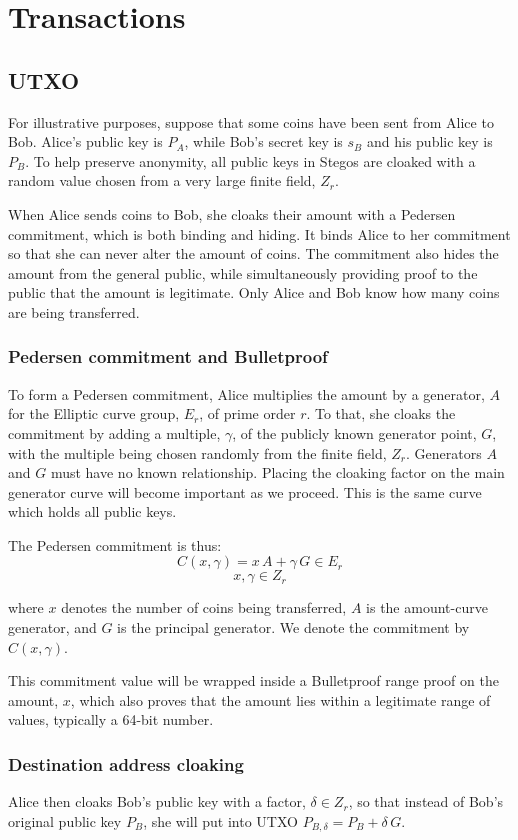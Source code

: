 \documentclass[8pt,fleqn,openany]{book}
\begin{document}
{\chapter{Transactions}

\section{UTXO}
For illustrative purposes, suppose that some coins have been sent from Alice to Bob. Alice’s public key is $P_A$, while Bob’s secret key is $s_B$ and his public key is $P_B$. To help preserve anonymity, all public keys in Stegos are cloaked with a random value chosen from a very large finite field, $Z_r$.

When Alice sends coins to Bob, she cloaks their amount with a Pedersen commitment, which is both binding and hiding. It binds Alice to her commitment so that she can never alter the amount of coins. The commitment also hides the amount from the general public, while simultaneously providing proof to the public that the amount is legitimate. Only Alice and Bob know how many coins are being transferred. 

\subsection{Pedersen commitment and Bulletproof} To form a Pedersen commitment, Alice multiplies the amount by a generator, $A$ for the Elliptic curve group, $E_r$, of prime order $r$. To that, she cloaks the commitment by adding a multiple, $\gamma$, of the publicly known generator point, $G$, with the multiple being chosen randomly from the finite field, $Z_r$. Generators $A$ and $G$ must have no known relationship. Placing the cloaking factor on the main generator curve will become important as we proceed. This is the same curve which holds all public keys. 

The Pedersen commitment is thus:
$$ C(x, \gamma) = x \, A + \gamma \, G \in E_r$$
$$x, \gamma \in Z_r$$

where $x$ denotes the number of coins being transferred, $A$ is the amount-curve generator, and $G$ is the principal generator. We denote the commitment by $C(x, \gamma)$. 

This commitment value will be wrapped inside a Bulletproof range proof on the amount, $x$, which also proves that the amount lies within a legitimate range of values, typically a 64-bit number.

\subsection{Destination address cloaking} Alice then cloaks Bob’s public key with a factor, $\delta \in Z_r$, so that instead of Bob’s original public key $P_B$, she will put into UTXO $P_{B, \delta} = P_B + \delta \, G$.

}
\end{document}
